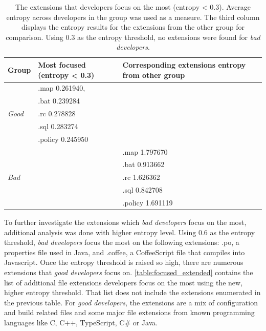 \begin{table}[h!]
\begin{center}
\begin{tabular}{ | m{5em} | m{15em}| m{15em}| } 
\hline
Group & Most focused (entropy < 0.3) & Corresponding extensions entropy from other group \\ 
\hline \hline
\multirow{5}{4em}{\textit{Good}} & .map 0.261940, &  \\
& .bat 0.239284  &  \\
& .rc 0.278828 &  \\
& .sql 0.283274&  \\
& .policy 0.245950  &  \\
\hline
\multirow{5}{4em}{\textit{Bad}} &  & .map 1.797670 \\ 
&  & .bat 0.913662  \\
& & .rc 1.626362  \\
&  &  .sql 0.842708\\
&   &  .policy 1.691119 \\
\hline
\end{tabular}
\end{center}
\caption[Extensions that Developers Focus on the Most]{The extensions that developers focus on the most (entropy < 0.3). Average entropy across developers in the group was used as a measure. The third column displays the entropy results for the extensions from the other group for comparison. Using 0.3 as the entropy threshold, no extensions were found for \textit{bad developers}.}
\label{table:focused}
\end{table}

To further investigate the extensions which \textit{bad developers} focus on the most, additional analysis was done with higher entropy level. Using 0.6 as the entropy threshold, \textit{bad developers} focus the most on the following extensions: .po, a properties file used in Java, and .coffee, a CoffeeScript file that compiles into Javascript.  Once the entropy threshold is raised so high, there are numerous extensions that \textit{good developers} focus on. \autoref{table:focused_extended} contains the list of additional file extensions developers focus on the most using the new, higher entropy threshold. That list does not include the extensions enumerated in the previous table. For \textit{good developers}, the extensions are a mix of configuration and build related files and some major file extensions from known programming languages like C, C++, TypeScript, C\# or Java. 

